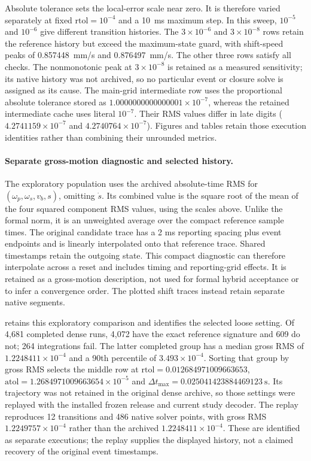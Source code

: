 \documentclass[11pt]{report}
\numberwithin{equation}{section}
\begin{document}
Absolute tolerance sets the local-error scale near zero. It is therefore
varied separately at fixed $\mathrm{rtol}=10^{-4}$ and a \SI{10}{ms}
maximum step. In this sweep, $10^{-5}$ and $10^{-6}$ give
different transition histories. The $3\times10^{-6}$ and $3\times10^{-8}$
rows retain the reference history but exceed the maximum-state guard, with
shift-speed peaks of \SI{0.857448}{mm/s} and \SI{0.876497}{mm/s}.
The other three rows satisfy all checks. The nonmonotonic peak at
$3\times10^{-8}$ is retained as a measured sensitivity; its native history
was not archived, so no particular event or closure solve is assigned as
its cause. The main-grid intermediate row uses the proportional absolute tolerance
stored as $1.0000000000000001\times10^{-7}$, whereas the retained intermediate
cache uses literal $10^{-7}$. Their RMS values differ in late digits
($4.2741159\times10^{-7}$ and $4.2740764\times10^{-7}$). Figures and tables
retain those execution identities rather than combining their unrounded
metrics.

\paragraph{Separate gross-motion diagnostic and selected history.}
The exploratory population uses the archived absolute-time RMS for
$(\omega_p,\omega_s,v_b,s)$, omitting $\dot s$. Its combined value is the
square root of the mean of the four squared component RMS values, using
the scales above. Unlike the formal norm, it is an unweighted average over
the compact reference sample times. The original candidate trace has a
2 ms reporting spacing plus event endpoints and is linearly interpolated
onto that reference trace. Shared timestamps retain the outgoing state.
This compact diagnostic can therefore interpolate across a reset and
includes timing and reporting-grid effects. It is retained as a gross-motion
description, not used for formal hybrid acceptance or to infer a convergence
order. The plotted shift traces instead retain separate native segments.

 retains this exploratory comparison
and identifies the selected loose setting. Of 4,681 completed dense runs, 4,072 have the exact reference signature and
609 do not; 264 integrations fail. The latter completed group has a median
gross RMS of $1.2248411\times10^{-4}$ and a 90th percentile of
$3.493\times10^{-4}$. Sorting that group by gross RMS selects the middle
row at $\mathrm{rtol}=0.012684971009663653$,
$\mathrm{atol}=1.2684971009663654\times10^{-5}$ and
$\Delta t_{\max}=0.025041423884469123~\mathrm{s}$. Its trajectory was not
retained in the original dense archive, so those settings were replayed with
the installed frozen release and current study decoder. The replay reproduces
12 transitions and 486 native solver points, with gross RMS
$1.2249757\times10^{-4}$ rather than the archived $1.2248411\times10^{-4}$.
These are identified as separate executions; the replay supplies the displayed
history, not a claimed recovery of the original event timestamps.
\end{document}
